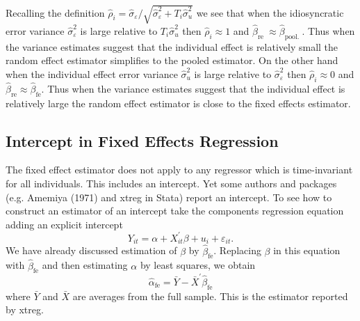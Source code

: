 \documentclass[10pt]{article}
\begin{document}
Recalling the definition $\widehat{\rho}_{i}=\widehat{\sigma}_{\varepsilon} / \sqrt{\widehat{\sigma}_{\varepsilon}^{2}+T_{i} \widehat{\sigma}_{u}^{2}}$ we see that when the idiosyncratic error variance $\widehat{\sigma}_{\varepsilon}^{2}$ is large relative to $T_{i} \widehat{\sigma}_{u}^{2}$ then $\widehat{\rho}_{i} \approx 1$ and $\widehat{\beta}_{\text {re }} \approx \widehat{\beta}_{\text {pool. }}$. Thus when the variance estimates suggest that the individual effect is relatively small the random effect estimator simplifies to the pooled estimator. On the other hand when the individual effect error variance $\widehat{\sigma}_{u}^{2}$ is large relative to $\widehat{\sigma}_{\varepsilon}^{2}$ then $\widehat{\rho}_{i} \approx 0$ and $\widehat{\beta}_{\mathrm{re}} \approx \widehat{\beta}_{\mathrm{fe}}$. Thus when the variance estimates suggest that the individual effect is relatively large the random effect estimator is close to the fixed effects estimator.

\subsection{Intercept in Fixed Effects Regression}
The fixed effect estimator does not apply to any regressor which is time-invariant for all individuals. This includes an intercept. Yet some authors and packages (e.g. Amemiya (1971) and xtreg in Stata) report an intercept. To see how to construct an estimator of an intercept take the components regression equation adding an explicit intercept
$$
Y_{i t}=\alpha+X_{i t}^{\prime} \beta+u_{i}+\varepsilon_{i t} .
$$
We have already discussed estimation of $\beta$ by $\widehat{\beta}_{\mathrm{fe}}$. Replacing $\beta$ in this equation with $\widehat{\beta}_{\mathrm{fe}}$ and then estimating $\alpha$ by least squares, we obtain
$$
\widehat{\alpha}_{\mathrm{fe}}=\bar{Y}-\bar{X}^{\prime} \widehat{\beta}_{\mathrm{fe}}
$$
where $\bar{Y}$ and $\bar{X}$ are averages from the full sample. This is the estimator reported by xtreg.
\end{document}
